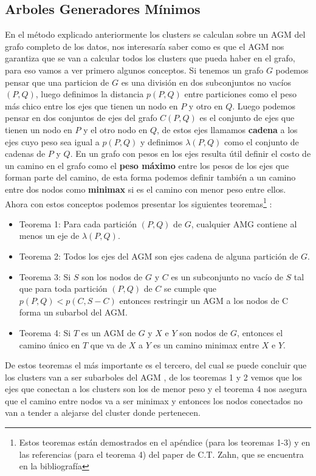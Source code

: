 \documentclass[11pt,a4paper]{article}
\begin{document}
\subsection{Arboles Generadores Mínimos}
En el método explicado anteriormente los clusters se calculan sobre un AGM del grafo completo de los datos, nos interesaría saber como es que el AGM nos garantiza que se van a calcular todos los clusters que pueda haber en el grafo, para eso vamos a ver primero algunos conceptos.
Si tenemos un grafo $G$ podemos pensar que una particion de $G$ es una división en dos subconjuntos no vacíos $(P, Q)$, luego definimos la distancia $p(P, Q)$ entre particiones como el peso más chico entre los ejes que tienen un nodo en $P$ y otro en $Q$. Luego podemos pensar en dos conjuntos de ejes del grafo $C(P, Q)$ es el conjunto de ejes que tienen un nodo en $P$ y el otro nodo en $Q$, de estos ejes llamamos \textbf{cadena} a los ejes cuyo peso sea igual a $p(P, Q)$ y definimos $\lambda(P, Q)$ como el conjunto de cadenas de $P$ y $Q$.
En un grafo con pesos en los ejes resulta útil definir el costo de un camino en el grafo como el \textbf{peso máximo} entre los pesos de los ejes que forman parte del camino, de esta forma podemos definir también a un camino entre dos nodos como \textbf{minimax} si es el camino con menor peso entre ellos.
Ahora con estos conceptos podemos presentar los siguientes teoremas\footnote{Estos teoremas están demostrados en el apéndice (para los teoremas 1-3) y en las referencias (para el teorema 4) del paper de C.T. Zahn, que se encuentra en la bibliografía} :
\begin{itemize}
	\item Teorema 1: Para cada partición $(P, Q)$ de $G$, cualquier AMG contiene al menos un eje de $\lambda(P, Q)$.
	\item Teorema 2: Todos los ejes del AGM son ejes cadena de alguna partición de $G$.
	\item Teorema 3: Si $S$ son los nodos de $G$ y $C$ es un subconjunto no vacío de $S$ tal que para toda partición $(P, Q)$ de $C$ se cumple que $p(P, Q) < p(C, S-C)$ entonces restringir un AGM a los nodos de C forma un subarbol del AGM.
	\item Teorema 4: Si $T$ es un AGM de $G$ y $X$ e $Y$ son nodos de $G$, entonces el camino único en $T$ que va de $X$ a $Y$ es un camino minimax entre $X$ e $Y$.
\end{itemize}

De estos teoremas el más importante es el tercero, del cual se puede concluir que los clusters van a ser subarboles del AGM , de los teoremas 1 y 2 vemos que los ejes que conectan a los clusters son los de menor peso y el teorema 4 nos asegura que el camino entre nodos va a ser minimax y entonces los nodos conectados no van a tender a alejarse del cluster donde pertenecen.
\end{document}
